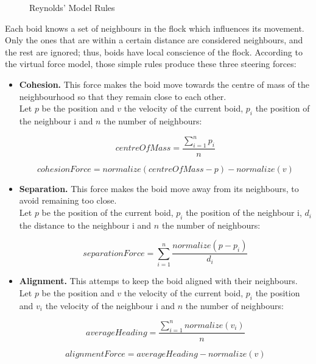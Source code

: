 \begin{figure}[!h]
\begin{tabular}{c c c}
 \end{tabular}
  \caption{Reynolds' Model Rules}
  \label{fig:crowds}
\end{figure}

Each boid knows a set of neighbours in the flock which influences its movement. Only the ones that are within a certain distance are considered neighbours, and the rest are ignored; thus, boids have local conscience of the flock. According to the virtual force model, those simple rules produce these three steering forces:

\begin{itemize}

\item{{\bf Cohesion.} This force makes the boid move towards the centre of mass of the neighbourhood so that they remain close to each other.\\

Let $p$ be the position and $v$ the velocity of the current boid, $p_i$ the position of the neighbour i and $n$ the number of neighbours:

\begin{equation}
  centreOfMass=\frac{\sum_{i=1}^np_i}{n}
\end{equation}

\begin{equation}
  cohesionForce=normalize(centreOfMass-p)-normalize(v)
\end{equation}
}

\item{{\bf Separation.} This force makes the boid move away from its neighbours, to avoid remaining too close.\\

Let $p$ be the position of the current boid, $p_i$ the position of the neighbour i, $d_i$ the distance to the neighbour i and $n$ the number of neighbours:

\begin{equation}
  separationForce=\sum_{i=1}^n\frac{normalize(p-p_i)}{d_i}
\end{equation}
}

\item{{\bf Alignment.} This attemps to keep the boid aligned with their neighbours.\\

Let $p$ be the position and $v$ the velocity of the current boid, $p_i$ the position and $v_i$ the velocity of the neighbour i and $n$ the number of neighbours:

\begin{equation}
  averageHeading=\frac{\sum_{i=1}^nnormalize(v_i)}{n}
\end{equation}

\begin{equation}
  alignmentForce=averageHeading-normalize(v)
\end{equation}
}

\end{itemize}

